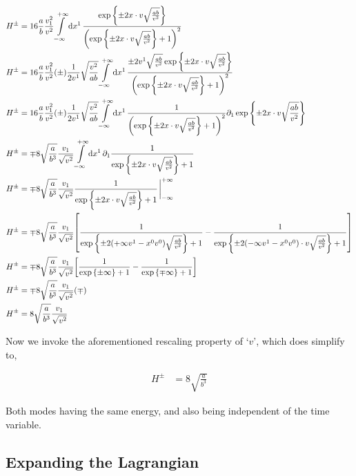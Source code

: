 \begin{align}
    H^\pm&=16\frac ab\frac{v_1^2}{v^2}\int\limits_{-\infty}^{+\infty}\dd{x^1}\frac{\exp\qty{\pm 2x\cdot v\sqrt{\frac{ab}{v^2}}}}
    {\qty(\exp\qty{\pm 2x\cdot v\sqrt{\frac{ab}{v^2}}}+1)^2}\nonumber\\
    H^\pm&=16\frac ab\frac{v_1^2}{v^2}\qty(\pm) \frac{1}{2v^1}\sqrt{\frac{v^2}{ab}}
    \int\limits_{-\infty}^{+\infty}\dd{x^1}\frac{\pm 2v^1\sqrt{\frac{ab}{v^2}}\exp\qty{\pm 2x\cdot v\sqrt{\frac{ab}{v^2}}}}
    {\qty(\exp\qty{\pm 2x\cdot v\sqrt{\frac{ab}{v^2}}}+1)^2}\nonumber\\
    H^\pm&=16\frac ab\frac{v_1^2}{v^2}\qty(\pm) \frac{1}{2v^1}\sqrt{\frac{v^2}{ab}}
    \int\limits_{-\infty}^{+\infty}\dd{x^1}\frac{1}
    {\qty(\exp\qty{\pm 2x\cdot v\sqrt{\frac{ab}{v^2}}}+1)^2}\partial_1\exp\qty{\pm 2x\cdot v\sqrt{\frac{ab}{v^2}}}\nonumber\\
    H^\pm&=\mp8\sqrt{\frac{a}{b^3}}\frac{v_1}{\sqrt{v^2}}
    \int\limits_{-\infty}^{+\infty}\dd{x^1}\partial_1\frac{1}
    {\exp\qty{\pm 2x\cdot v\sqrt{\frac{ab}{v^2}}}+1}\nonumber\\
    H^\pm&=\mp8\sqrt{\frac{a}{b^3}}\frac{v_1}{\sqrt{v^2}}
    \frac{1}
    {\exp\qty{\pm 2x\cdot v\sqrt{\frac{ab}{v^2}}}+1}\eval_{-\infty}^{+\infty}\nonumber\\
    H^\pm&=\mp8\sqrt{\frac{a}{b^3}}\frac{v_1}{\sqrt{v^2}}
    \qty[\frac{1}
    {\exp\qty{\pm 2\qty(+\infty v^1-x^0v^0)\sqrt{\frac{ab}{v^2}}}+1}-\frac{1}
    {\exp\qty{\pm 2\qty(-\infty v^1-x^0v^0)\cdot v\sqrt{\frac{ab}{v^2}}}+1}]\nonumber\\
    H^\pm&=\mp8\sqrt{\frac{a}{b^3}}\frac{v_1}{\sqrt{v^2}}
    \qty[\frac{1}
    {\exp\qty{\pm \infty}+1}-\frac{1}
    {\exp\qty{\mp \infty}+1}]\nonumber\\
    H^\pm&=\mp8\sqrt{\frac{a}{b^3}}\frac{v_1}{\sqrt{v^2}}
    \qty(\mp)\nonumber\\
    H^\pm&=8\sqrt{\frac{a}{b^3}}\frac{v_1}{\sqrt{v^2}}\nonumber
\end{align}

Now we invoke the aforementioned rescaling property of `$v$', which does simplify to,

\begin{align}
    H^\pm&=8\sqrt{\frac{a}{b^3}}\nonumber
\end{align}

Both modes having the same energy, and also being independent of the time variable.

\subsection{Expanding the Lagrangian}

